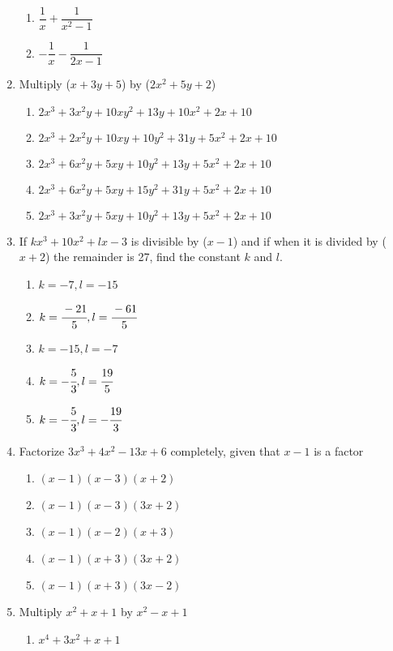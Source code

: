 \begin{multicols}{2}
\begin{enumerate}[label={\arabic*.}]
\begin{enumerate}[label={\Alph*.}]
	\item \(\dfrac{1}{x} + \dfrac{1}{{x}^{2} - 1}\)
	\item \(-\dfrac{1}{x} - \dfrac{1}{2x - 1}\)
	\end{enumerate}
\item Multiply (\(x + 3y + 5\)) by (\(2{x}^{2} + 5y + 2\))
	\begin{enumerate}[label={\Alph*.}]
	\item \(2{x}^{3} + 3{x}^{2}y + 10xy^2 + 13y + 10{x}^{2} + 2x + 10\)
	\item \(2{x}^{3} + 2{x}^{2}y + 10xy + 10y^2 +  31y + 5{x}^{2} + 2x + 10\)
	\item \(2{x}^{3} + 6{x}^{2}y + 5xy + 10y^2 + 13y + 5{x}^{2} + 2x + 10\)
	\item \(2{x}^{3} + 6{x}^{2}y + 5xy + 15y^2 + 31y + 5{x}^{2} + 2x + 10\)
	\item \(2{x}^{3} + 3{x}^{2}y + 5xy + 10y^2 + 13y + 5{x}^{2} + 2x + 10\)
	\end{enumerate}
\item If \(k{x}^{3} + 	10{x}^{2} + lx - 3\) is divisible by (\(x - 1\)) and if when it is divided by (\(x + 2\)) the remainder is 27,
find the constant \(k\) and \(l\).
	\begin{enumerate}[label={\Alph*.}]
	\item \(k = -7, l = -15\)
	\item \(k = \cfrac{-21}{5}, l = \cfrac{-61}{5}\)
	\item \(k =-15, l =-7\)
	\item \(k = -\cfrac{5}{3}, l = \cfrac{19}{5}\)
	\item \(k = -\cfrac{5}{3}, l = -\cfrac{19}{3}\)
	\end{enumerate}
\item Factorize \(3{x}^{3} + 4{x}^{2} - 13x + 6\) completely, given that \(x - 1\) is a factor
	\begin{enumerate}[label={\Alph*.}]
	\item \((x-1)(x-3)(x+2)\)
	\item \((x-1)(x-3)(3x+2)\)
	\item \((x-1)(x-2)(x+3)\)
	\item \((x-1)(x+3)(3x+2)\)
	\item \((x-1)(x+3)(3x-2)\)
	\end{enumerate}
\item Multiply \({x}^{2}+x+1\) by \({x}^{2}-x+1\)
	\begin{enumerate}[label={\Alph*.}]
	\item \(x^4+3{x}^{2}+x+1\)

\end{enumerate}
\end{enumerate}
\end{multicols}
